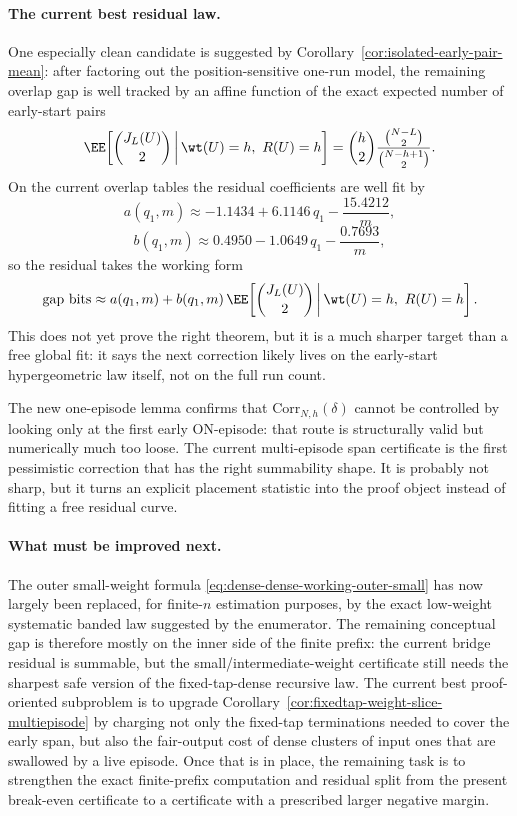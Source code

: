 \paragraph{The current best residual law.}
One especially clean candidate is suggested by Corollary~\ref{cor:isolated-early-pair-mean}: after factoring out the
position-sensitive one-run model, the remaining overlap gap is well tracked by an affine function of the exact
expected number of early-start pairs
\[
\EE\!\left[\binom{J_L(U)}{2}\,\middle|\, \wt(U)=h,\ R(U)=h\right]
=
\binom{h}{2}\frac{\binom{N-L}{2}}{\binom{N-h+1}{2}}.
\]
On the current overlap tables the residual coefficients are well fit by
\[
a(q_1,m)\approx -1.1434 + 6.1146\,q_1 - \frac{15.4212}{m},
\]
\[
b(q_1,m)\approx 0.4950 - 1.0649\,q_1 - \frac{0.7693}{m},
\]
so the residual takes the working form
\[
\text{gap bits}
\approx
a(q_1,m)
+
b(q_1,m)\,
\EE\!\left[\binom{J_L(U)}{2}\,\middle|\, \wt(U)=h,\ R(U)=h\right].
\]
This does not yet prove the right theorem, but it is a much sharper target than a free global fit: it says the next
correction likely lives on the early-start hypergeometric law itself, not on the full run count.

The new one-episode lemma confirms that \(\mathrm{Corr}_{N,h}(\delta)\) cannot be controlled by looking only at the
first early ON-episode: that route is structurally valid but numerically much too loose. The current multi-episode
span certificate is the first pessimistic correction that has the right summability shape. It is probably not sharp,
but it turns an explicit placement statistic into the proof object instead of fitting a free residual curve.

\paragraph{What must be improved next.}
The outer small-weight formula \eqref{eq:dense-dense-working-outer-small} has now largely been replaced, for
finite-\(n\) estimation purposes, by the exact low-weight systematic banded law suggested by the enumerator.
The remaining conceptual gap is therefore mostly on the inner side of the finite prefix: the current bridge residual
is summable, but the small/intermediate-weight certificate still needs the sharpest safe version of the
fixed-tap-dense recursive law.  The current best proof-oriented subproblem is to upgrade
Corollary~\ref{cor:fixedtap-weight-slice-multiepisode} by charging not only the fixed-tap terminations needed to cover
the early span, but also the fair-output cost of dense clusters of input ones that are swallowed by a live episode.
Once that is in place, the remaining task is to strengthen the exact finite-prefix computation and residual split from
the present break-even certificate to a certificate with a prescribed larger negative margin.
